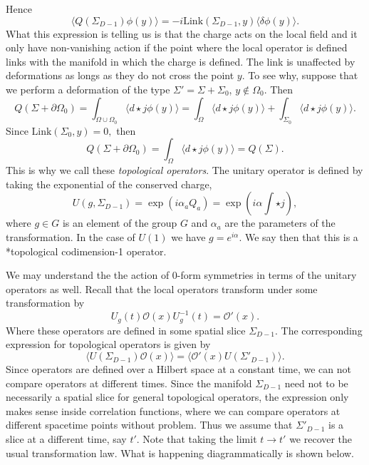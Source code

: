 \documentclass{article}
\begin{document}
Hence
\begin{equation}
	\langle Q(\Sigma_{D-1})\phi(y)\rangle=-i\text{Link}(\Sigma_{D-1},y)\langle\delta\phi(y)\rangle.
\end{equation}
What this expression is telling us is that the charge acts on the local field and it only have non-vanishing action if the point where the local operator is defined links with the manifold in which the charge is defined. The link is unaffected by deformations as longs as they do not cross the point $y$.  To see why, suppose that we perform a deformation of the type $\Sigma'=\Sigma+\Sigma_0$, $y\not\in\Omega_0.$ Then 
\begin{equation}
	Q(\Sigma+\partial\Omega_0)=\int_{\Omega\cup\Omega_0}\langle d\star j\phi(y)\rangle=\int_{\Omega}\langle d\star j\phi(y)\rangle+\int_{\Sigma_0}\langle d\star j\phi(y)\rangle.
\end{equation}
Since $\text{Link}(\Sigma_0,y)=0,$ then
\begin{equation}
	Q(\Sigma+\partial\Omega_0)=\int_{\Omega}\langle d\star j\phi(y)\rangle=Q(\Sigma).
\end{equation}
This is why we call these \textit{topological operators}. The unitary operator is defined by taking the exponential of the conserved charge,
\begin{equation}
	U(g,\Sigma_{D-1})=\exp(i\alpha_aQ_a)=\exp\left(i\alpha\int\star j\right),
\end{equation}
where $g\in G$  is an element of the group $G$ and $\alpha_a$ are the parameters of the transformation. In the case of  $U(1)$  we have $g=e^{i\alpha}$.  We say then that this is a *topological codimension-1 operator. 

We may understand the the action of 0-form symmetries in terms of the unitary operators as well. Recall that the local operators transform under some transformation by
\begin{equation}
	U_g(t)\mathcal{O}(x)U^{-1}_g(t)=\mathcal{O}'(x).
\end{equation}
Where these operators are defined in some spatial slice $\Sigma_{D-1}$. The corresponding expression for topological operators is given by 
\begin{equation}
	\langle U(\Sigma_{D-1})\mathcal{O}(x)\rangle=\langle \mathcal{O}'(x)U(\Sigma'_{D-1})\rangle.
\end{equation}
Since operators are defined over a Hilbert space at a constant time, we can not compare operators at different times. Since the manifold $\Sigma_{D-1}$ need not to be necessarily a spatial slice for general topological operators, the expression only makes sense inside correlation functions, where we can compare operators at different spacetime points without problem. Thus we assume that $\Sigma'_{D-1}$ is a slice at a different time, say $t'$. Note that taking the limit $t\to t'$ we recover the usual transformation law. What is happening diagrammatically is shown below. 
\end{document}
